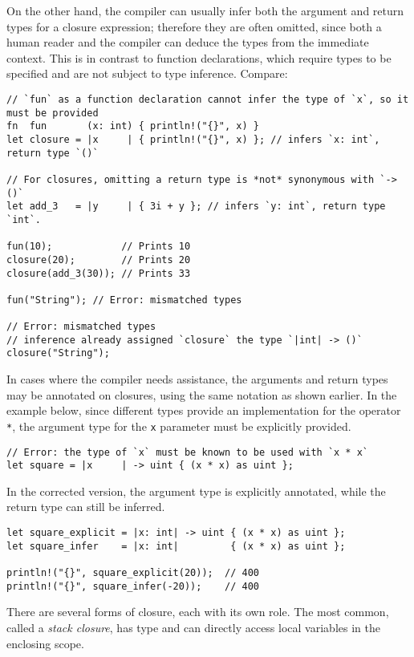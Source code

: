 \documentclass[]{article}
\begin{document}
On the other hand, the compiler can usually infer both the argument and
return types for a closure expression; therefore they are often omitted,
since both a human reader and the compiler can deduce the types from the
immediate context. This is in contrast to function declarations, which
require types to be specified and are not subject to type inference.
Compare:

\begin{verbatim}
// `fun` as a function declaration cannot infer the type of `x`, so it must be provided
fn  fun       (x: int) { println!("{}", x) }
let closure = |x     | { println!("{}", x) }; // infers `x: int`, return type `()`

// For closures, omitting a return type is *not* synonymous with `-> ()`
let add_3   = |y     | { 3i + y }; // infers `y: int`, return type `int`.

fun(10);            // Prints 10
closure(20);        // Prints 20
closure(add_3(30)); // Prints 33

fun("String"); // Error: mismatched types

// Error: mismatched types
// inference already assigned `closure` the type `|int| -> ()`
closure("String");
\end{verbatim}

In cases where the compiler needs assistance, the arguments and return
types may be annotated on closures, using the same notation as shown
earlier. In the example below, since different types provide an
implementation for the operator \texttt{*}, the argument type for the
\texttt{x} parameter must be explicitly provided.

\begin{verbatim}
// Error: the type of `x` must be known to be used with `x * x`
let square = |x     | -> uint { (x * x) as uint };
\end{verbatim}

In the corrected version, the argument type is explicitly annotated,
while the return type can still be inferred.

\begin{verbatim}
let square_explicit = |x: int| -> uint { (x * x) as uint };
let square_infer    = |x: int|         { (x * x) as uint };

println!("{}", square_explicit(20));  // 400
println!("{}", square_infer(-20));    // 400
\end{verbatim}

There are several forms of closure, each with its own role. The most
common, called a \emph{stack closure}, has type
\texttt{\textbar{}\textbar{}} and can directly access local variables in
the enclosing scope.
\end{document}
